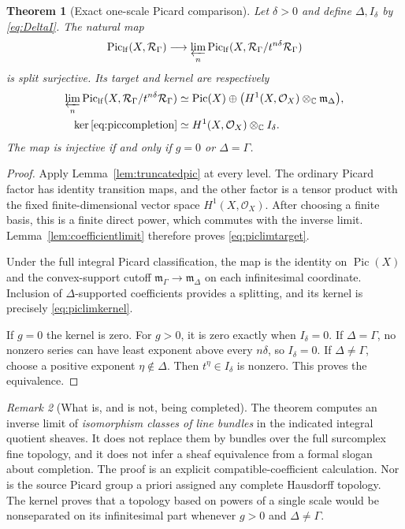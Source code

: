 \documentclass[11pt,letterpaper]{article}
\numberwithin{equation}{section}
\newtheorem{theorem}{Theorem}[section]
\theoremstyle{definition}
\theoremstyle{remark}
\newtheorem{remark}[theorem]{Remark}
\newcommand{\C}{\mathbb C}
\newcommand{\RR}{\mathcal R}
\newcommand{\OO}{\mathcal O}
\newcommand{\mm}{\mathfrak m}
\newcommand{\Pic}{\operatorname{Pic}}
\newcommand{\Piclf}{\operatorname{Pic}_{\mathrm{lf}}}
\newcommand{\Rg}{\RR_\Gamma}
\newcommand{\mg}{\mm_\Gamma}
\newcommand{\ot}{\otimes_{\C}}
\begin{document}
\begin{theorem}[Exact one-scale Picard comparison]
\label{thm:adic}
Let $\delta>0$ and define $\Delta,I_\delta$ by
\eqref{eq:DeltaI}. The natural map
\begin{equation}
 \Piclf(X,\Rg)\longrightarrow
       \varprojlim_n\Piclf(X,\Rg/t^{n\delta}\Rg)
 \label{eq:piccompletion}
\end{equation}
is split surjective. Its target and kernel are respectively
\begin{align}
 \varprojlim_n\Piclf(X,\Rg/t^{n\delta}\Rg)
    &\simeq\Pic(X)\oplus
             \bigl(H^1(X,\OO_X)\ot\mm_\Delta\bigr),
        \label{eq:piclimtarget}\\
 \ker\eqref{eq:piccompletion}
    &\simeq H^1(X,\OO_X)\ot I_\delta.
        \label{eq:piclimkernel}
\end{align}
The map is injective if and only if $g=0$ or $\Delta=\Gamma$.
\end{theorem}
\begin{proof}
Apply Lemma~\ref{lem:truncatedpic} at every level. The ordinary Picard
factor has identity transition maps, and the other factor is a tensor
product with the fixed finite-dimensional vector space
$H^1(X,\OO_X)$. After choosing a finite basis, this is a finite direct
power, which commutes with the inverse limit. Lemma~\ref{lem:coefficientlimit}
therefore proves \eqref{eq:piclimtarget}.

Under the full integral Picard classification, the map is the identity
on $\Pic(X)$ and the convex-support cutoff
$\mg\to\mm_\Delta$ on each infinitesimal coordinate. Inclusion of
$\Delta$-supported coefficients provides a splitting, and its kernel
is precisely \eqref{eq:piclimkernel}.

If $g=0$ the kernel is zero. For $g>0$, it is zero exactly when
$I_\delta=0$. If $\Delta=\Gamma$, no nonzero series can have least
exponent above every $n\delta$, so $I_\delta=0$. If
$\Delta\ne\Gamma$, choose a positive exponent $\eta\notin\Delta$.
Then $t^\eta\in I_\delta$ is nonzero. This proves the equivalence.
\end{proof}

\begin{remark}[What is, and is not, being completed]
The theorem computes an inverse limit of \emph{isomorphism classes of
line bundles} in the indicated integral quotient sheaves. It does not
replace them by bundles over the full surcomplex fine topology, and it
does not infer a sheaf equivalence from a formal slogan about completion.
The proof is an explicit compatible-coefficient calculation. Nor is the
source Picard group a priori assigned any complete Hausdorff topology.
The kernel proves that a topology based on powers of a single scale
would be nonseparated on its infinitesimal part whenever
$g>0$ and $\Delta\ne\Gamma$.
\end{remark}
\end{document}
